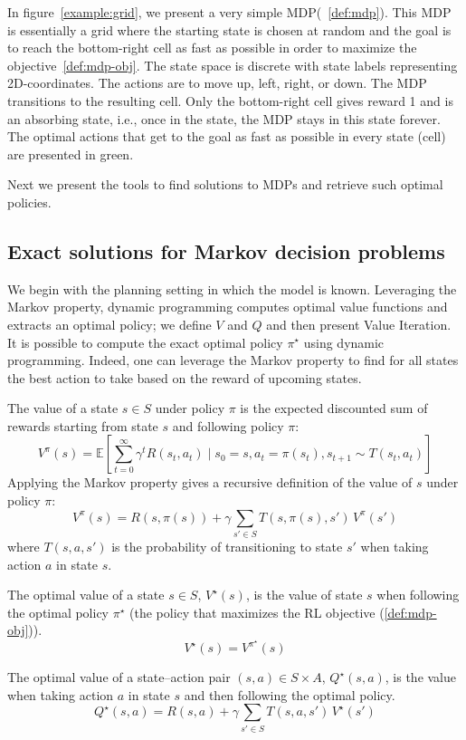 In figure~\ref{example:grid}, we present a very simple MDP(~\ref{def:mdp}).
This MDP is essentially a grid where the starting state is chosen at random and the goal is to reach the bottom-right cell as fast as possible in order to maximize the objective~\ref{def:mdp-obj}.
The state space is discrete with state labels representing 2D-coordinates.
The actions are to move up, left, right, or down. The MDP transitions to the resulting cell. 
Only the bottom-right cell gives reward 1 and is an absorbing state, i.e., once in the state, the MDP stays in this state forever.
The optimal actions that get to the goal as fast as possible in every state (cell) are presented in green.

Next we present the tools to find solutions to MDPs and retrieve such optimal policies.

\subsection{Exact solutions for Markov decision problems}\label{sec:values}
We begin with the planning setting in which the model is known. Leveraging the Markov property, dynamic programming computes optimal value functions and extracts an optimal policy; we define $V$ and $Q$ and then present Value Iteration.
It is possible to compute the exact optimal policy $\pi^\star$ using dynamic programming\cite{Bellman}.
Indeed, one can leverage the Markov property to find for all states the best action to take based on the reward of upcoming states.
\begin{definition}\label{def:vs} 
    The value of a state $s\in S$ under policy $\pi$ is the expected discounted sum of rewards starting from state $s$ and following policy $\pi$:
    $$V^\pi(s) = \mathbb{E}\left[\sum_{t=0}^{\infty} \gamma^t R(s_t, a_t) \mid s_0 = s, a_t = \pi(s_t), s_{t+1} \sim T(s_t, a_t)\right]$$
    Applying the Markov property gives a recursive definition of the value of $s$ under policy $\pi$:
    $$V^\pi(s) = R(s,\pi(s)) + \gamma \sum_{s' \in S} T(s,\pi(s),s')\,V^\pi(s')$$
    where $T(s,a,s')$ is the probability of transitioning to state $s'$ when taking action $a$ in state $s$.
\end{definition}
\begin{definition} The optimal value of a state $s\in S$, $V^\star(s)$, is the value of state $s$ when following the optimal policy $\pi^{\star}$ (the policy that maximizes the RL objective (\ref{def:mdp-obj})).
    $$V^{\star}(s) = V^{\pi^{\star}}(s)$$
\end{definition}
\begin{definition} The optimal value of a state–action pair $(s,a)\in S\times A$, $Q^\star(s,a)$, is the value when taking action $a$ in state $s$ and then following the optimal policy.
    $$Q^{\star}(s,a) = R(s, a) + \gamma\sum_{s'\in S} T(s,a,s')\,V^{\star}(s')$$
\end{definition}

